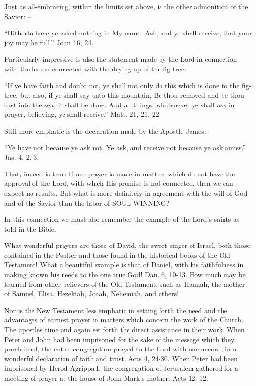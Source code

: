 \documentclass[
]{book}
\begin{document}
Just as all-embracing, within the limits set above, is the other admonition of the Savior: --

``Hitherto have ye asked nothing in My name. Ask, and ye shall receive, that your joy may be full.'' John 16, 24.

Particularly impressive is also the statement made by the Lord in connection with the lesson connected with the drying up of the fig-tree: --

``If ye have faith and doubt not, ye shall not only do this which is done to the fig-tree, but also, if ye shall say unto this mountain, Be thou removed and be thou cast into the sea, it shall be done. And all things, whatsoever ye shall ask in prayer, believing, ye shall receive.'' Matt. 21, 21. 22.

Still more emphatic is the declaration made by the Apostle James: --

``Ye have not because ye ask not. Ye ask, and receive not because ye ask amiss.'' Jas. 4, 2. 3.

That, indeed is true: If our prayer is made in matters which do not have the approval of the Lord, with which His promise is not connected, then we can expect no results. But what is more definitely in agreement with the will of God and of the Savior than the labor of SOUL-WINNING?

In this connection we must also remember the example of the Lord's saints as told in the Bible.

What wonderful prayers are those of David, the sweet singer of Israel, both those contained in the Psalter and those found in the historical books of the Old Testament! What a beautiful example is that of Daniel, with his faithfulness in making known his needs to the one true God! Dan. 6, 10-13. How much may be learned from other believers of the Old Testament, such as Hannah, the mother of Samuel, Elisa, Hezekiah, Jonah, Nehemiah, and others!

Nor is the New Testament less emphatic in setting forth the need and the advantages of earnest prayer in matters which concern the work of the Church. The apostles time and again set forth the direct assistance in their work. When Peter and John had been imprisoned for the sake of the message which they proclaimed, the entire congregation prayed to the Lord with one accord, in a wonderful declaration of faith and trust. Acts 4, 24-30. When Peter had been imprisoned by Herod Agrippa I, the congregation of Jerusalem gathered for a meeting of prayer at the house of John Mark's mother. Acts 12, 12.
\end{document}
